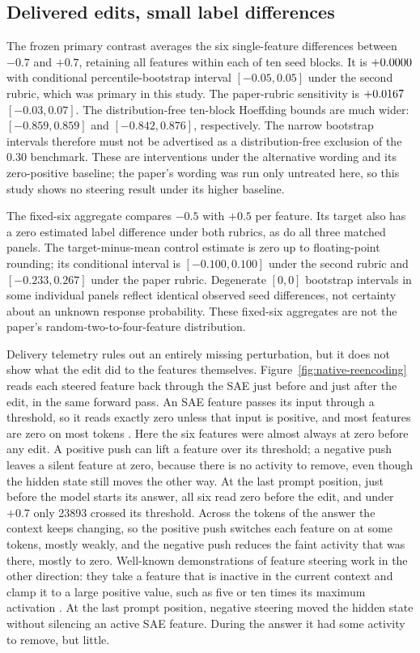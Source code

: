 \subsection{Delivered edits, small label differences}

The frozen primary contrast averages the six single-feature differences
between $-0.7$ and $+0.7$, retaining all features within each of ten seed
blocks. It is $+0.0000{}$ with conditional percentile-bootstrap interval
$[-0.05, 0.05]$ under the second rubric, which was primary in this study. The
paper-rubric sensitivity
is $+0.0167{}$ $[-0.03, 0.07]$. The distribution-free ten-block Hoeffding bounds
are much wider: $[-0.859,0.859]$ and $[-0.842,0.876]$, respectively. The
narrow bootstrap intervals therefore must not be advertised as a
distribution-free exclusion of the 0.30 benchmark.
These are interventions under the alternative wording and its zero-positive
baseline; the paper's wording was run only untreated here, so this study shows
no steering result under its higher baseline.

The fixed-six aggregate compares $-0.5$ with $+0.5$ per feature. Its target
also has a zero estimated label difference
under both rubrics, as do all three matched panels. The target-minus-mean
control estimate is zero up to floating-point rounding; its conditional
interval is $[-0.100,0.100]$ under the second rubric and
$[-0.233,0.267]$ under the paper rubric. Degenerate $[0,0]$ bootstrap intervals
in some individual panels reflect identical observed seed differences, not
certainty about an unknown response probability. These fixed-six aggregates
are not the paper's random-two-to-four-feature distribution.

Delivery telemetry rules out an entirely missing perturbation, but it does
not show what the edit did to the features themselves.
Figure~\ref{fig:native-reencoding} reads each steered feature back through
the SAE just before and just after the edit, in the same forward pass. An SAE
feature passes its input through a threshold, so it reads exactly zero
unless that input is positive, and most features are zero on most tokens
\citep{cunningham2023sparse}. Here the six features were almost always at
zero before any edit. A positive push can lift a feature over its threshold;
a negative push leaves a silent feature at zero, because there is no
activity to remove, even though the hidden state still moves the other way.
At the last prompt position, just before the model starts its answer, all
six read zero before the edit, and under $+0.7$ only 23893 crossed its
threshold. Across the tokens of the answer the context keeps changing, so
the positive push switches each feature on at some tokens, mostly weakly,
and the negative push reduces the faint activity that was there, mostly to
zero. Well-known demonstrations of feature steering work in the other
direction: they take a feature that is inactive in the current context and
clamp it to a large positive value, such as five or ten times its maximum
activation \citep{templeton2024scaling}. At the last prompt position,
negative steering moved the hidden state without silencing an active SAE
feature. During the answer it had some activity to remove, but little.

